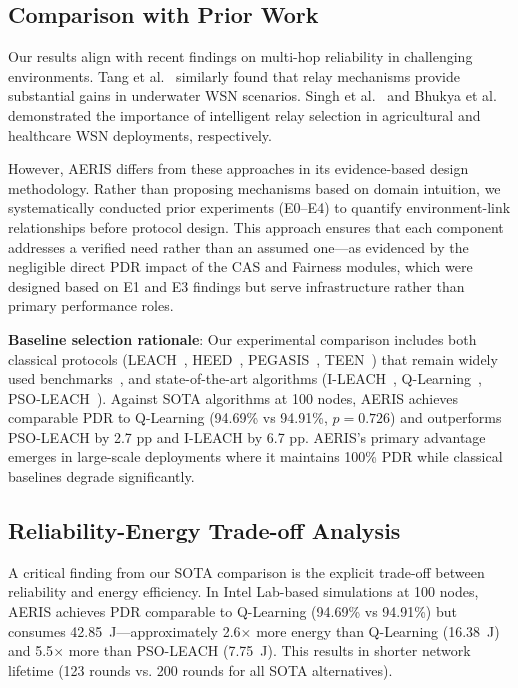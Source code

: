 \documentclass[sensors,article,submit,moreauthors,pdftex]{Definitions/mdpi}
\begin{document}
\subsection{Comparison with Prior Work}

Our results align with recent findings on multi-hop reliability in challenging environments. Tang et al.~\cite{Tang2025UWSN} similarly found that relay mechanisms provide substantial gains in underwater WSN scenarios. Singh et al.~\cite{Singh2025Enhanced} and Bhukya et al.~\cite{Bhukya2025Hybrid} demonstrated the importance of intelligent relay selection in agricultural and healthcare WSN deployments, respectively.

However, AERIS differs from these approaches in its evidence-based design methodology. Rather than proposing mechanisms based on domain intuition, we systematically conducted prior experiments (E0--E4) to quantify environment-link relationships before protocol design. This approach ensures that each component addresses a verified need rather than an assumed one---as evidenced by the negligible direct PDR impact of the CAS and Fairness modules, which were designed based on E1 and E3 findings but serve infrastructure rather than primary performance roles.

\textbf{Baseline selection rationale}: Our experimental comparison includes both classical protocols (LEACH~\cite{Heinzelman2000LEACH}, HEED~\cite{Younis2004HEED}, PEGASIS~\cite{Lindsey2002PEGASIS}, TEEN~\cite{Manjeshwar2001TEEN}) that remain widely used benchmarks~\cite{Kandris2020,Singh2021Energy}, and state-of-the-art algorithms (I-LEACH~\cite{Singhal2020ILEACH}, Q-Learning~\cite{Khlifi2021QLearning}, PSO-LEACH~\cite{Rao2017PSOLEACH}). Against SOTA algorithms at 100 nodes, AERIS achieves comparable PDR to Q-Learning (94.69\% vs 94.91\%, $p=0.726$) and outperforms PSO-LEACH by 2.7 pp and I-LEACH by 6.7 pp. AERIS's primary advantage emerges in large-scale deployments where it maintains 100\% PDR while classical baselines degrade significantly.

\subsection{Reliability-Energy Trade-off Analysis}

A critical finding from our SOTA comparison is the explicit trade-off between reliability and energy efficiency. In Intel Lab-based simulations at 100 nodes, AERIS achieves PDR comparable to Q-Learning (94.69\% vs 94.91\%) but consumes 42.85~J---approximately 2.6$\times$ more energy than Q-Learning (16.38~J) and 5.5$\times$ more than PSO-LEACH (7.75~J). This results in shorter network lifetime (123 rounds vs. 200 rounds for all SOTA alternatives).
\end{document}
